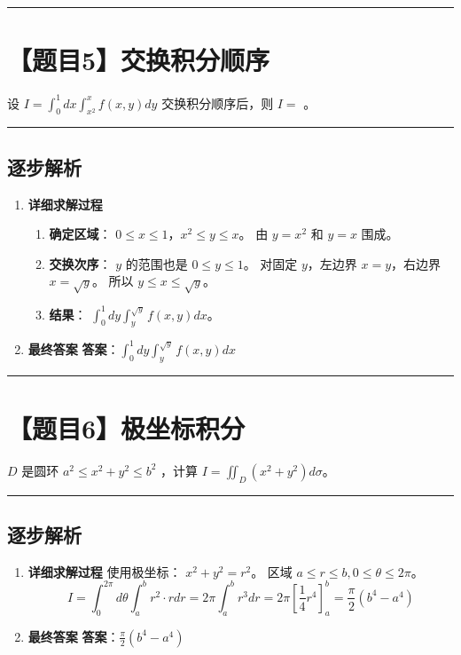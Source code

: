 \documentclass[UTF8]{ctexart}
\newenvironment{redenv}{\color{red}}{}
\newenvironment{detailedanalysis}{%
    \color{red}
    \begin{enumerate}[label=\textbf{第\arabic*步：}, leftmargin=*, align=left, itemsep=1.5ex]
}{%
    \end{enumerate}
}
\newcommand{\problemrule}{\noindent\rule{\textwidth}{1.5pt}\vspace{-0.8em}}
\newcommand{\analysisrule}{\noindent\rule{\textwidth}{0.8pt}\vspace{-0.8em}}
\newcommand{\blank}[1]{\underline{\hspace{#1}}}
\begin{document}
\problemrule
\section*{【题目5】交换积分顺序}
设 $ I = \int_{0}^{1} dx \int_{x^{2}}^{x} f(x, y) dy $ 交换积分顺序后，则 $ I = $ \blank{2cm}。

\begin{redenv}
\analysisrule
\subsection*{逐步解析}

\begin{detailedanalysis}
\item \textbf{详细求解过程}
\begin{enumerate}[label=(\arabic*)]
\item \textbf{确定区域}：
$0 \le x \le 1$，$x^2 \le y \le x$。
由 $y=x^2$ 和 $y=x$ 围成。
\item \textbf{交换次序}：
$y$ 的范围也是 $0 \le y \le 1$。
对固定 $y$，左边界 $x=y$，右边界 $x=\sqrt{y}$。
所以 $y \le x \le \sqrt{y}$。
\item \textbf{结果}：
$\int_0^1 dy \int_y^{\sqrt{y}} f(x,y) dx$。
\end{enumerate}

\item \textbf{最终答案}
\textbf{答案}：$ \int_0^1 dy \int_y^{\sqrt{y}} f(x,y) dx $
\end{detailedanalysis}
\end{redenv}

\problemrule
\section*{【题目6】极坐标积分}
$D$ 是圆环 $ a^{2}\leq x^{2}+y^{2}\leq b^{2} $ ，计算 $ I=\iint_{D}(x^{2}+y^{2})d\sigma $。

\begin{redenv}
\analysisrule
\subsection*{逐步解析}

\begin{detailedanalysis}
\item \textbf{详细求解过程}
使用极坐标：
$x^2+y^2 = r^2$。
区域 $a \le r \le b, 0 \le \theta \le 2\pi$。
$$ I = \int_0^{2\pi} d\theta \int_a^b r^2 \cdot r dr = 2\pi \int_a^b r^3 dr = 2\pi [\frac{1}{4}r^4]_a^b = \frac{\pi}{2}(b^4 - a^4) $$

\item \textbf{最终答案}
\textbf{答案}：$ \frac{\pi}{2}(b^4 - a^4) $
\end{detailedanalysis}
\end{redenv}
\end{document}
